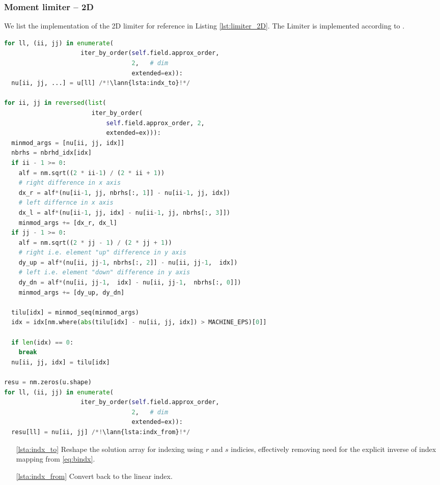 \subsubsection{Moment limiter -- 2D}
\label{se:i_moment_lim_2D}
We list the implementation of the 2D limiter for reference in Listing \ref{lst:limiter_2D}. The Limiter is
implemented according to .
\setcounter{lstannotation}{0}
\begin{lstlisting}[language=Python, caption=Moment limiter for
cartesian grid \label{lst:limiter_2D}]
for ll, (ii, jj) in enumerate(
                     iter_by_order(self.field.approx_order,
                                   2,   # dim
                                   extended=ex)):
  nu[ii, jj, ...] = u[ll] /*!\lann{lsta:indx_to}!*/

for ii, jj in reversed(list(
                        iter_by_order(
                            self.field.approx_order, 2,
                            extended=ex))):
  minmod_args = [nu[ii, jj, idx]]
  nbrhs = nbrhd_idx[idx]
  if ii - 1 >= 0:
    alf = nm.sqrt((2 * ii-1) / (2 * ii + 1))
    # right difference in x axis
    dx_r = alf*(nu[ii-1, jj, nbrhs[:, 1]] - nu[ii-1, jj, idx])
    # left differnce in x axis
    dx_l = alf*(nu[ii-1, jj, idx] - nu[ii-1, jj, nbrhs[:, 3]])
    minmod_args += [dx_r, dx_l]
  if jj - 1 >= 0:
    alf = nm.sqrt((2 * jj - 1) / (2 * jj + 1))
    # right i.e. element "up" difference in y axis
    dy_up = alf*(nu[ii, jj-1, nbrhs[:, 2]] - nu[ii, jj-1,  idx])
    # left i.e. element "down" difference in y axis
    dy_dn = alf*(nu[ii, jj-1,  idx] - nu[ii, jj-1,  nbrhs[:, 0]])
    minmod_args += [dy_up, dy_dn]

  tilu[idx] = minmod_seq(minmod_args)
  idx = idx[nm.where(abs(tilu[idx] - nu[ii, jj, idx]) > MACHINE_EPS)[0]]

  if len(idx) == 0:
    break
  nu[ii, jj, idx] = tilu[idx]

resu = nm.zeros(u.shape)
for ll, (ii, jj) in enumerate(
                     iter_by_order(self.field.approx_order,
                                   2,   # dim
                                   extended=ex)):
  resu[ll] = nu[ii, jj] /*!\lann{lsta:indx_from}!*/
\end{lstlisting}
\begin{itemize}
    \item[\ref{lsta:indx_to}] Reshape the solution array for indexing using $r$ and $s$ indicies,
    effectively removing need for the explicit inverse of index mapping from \eqref{eq:bindx}.
    \item [\ref{lsta:indx_from}] Convert back to the linear index.
\end{itemize}


